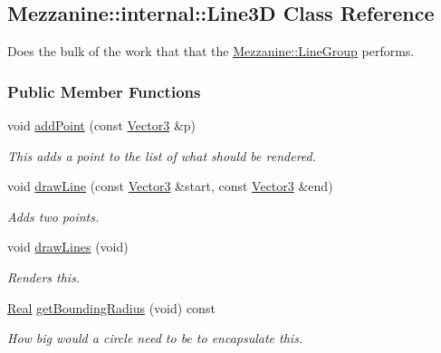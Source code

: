 \hypertarget{classMezzanine_1_1internal_1_1Line3D}{
\subsection{Mezzanine::internal::Line3D Class Reference}
\label{classMezzanine_1_1internal_1_1Line3D}
}


Does the bulk of the work that that the \hyperlink{classMezzanine_1_1LineGroup}{Mezzanine::LineGroup} performs.  


\subsubsection*{Public Member Functions}
\begin{DoxyCompactItemize}
\item 
void \hyperlink{classMezzanine_1_1internal_1_1Line3D_a6424bf33cfa273625e1c150905fb1afd}{addPoint} (const \hyperlink{classMezzanine_1_1Vector3}{Vector3} \&p)
\begin{DoxyCompactList}\small\item\em This adds a point to the list of what should be rendered. \item\end{DoxyCompactList}\item 
void \hyperlink{classMezzanine_1_1internal_1_1Line3D_a17264ad5672bef8807ce6b4a8366e573}{drawLine} (const \hyperlink{classMezzanine_1_1Vector3}{Vector3} \&start, const \hyperlink{classMezzanine_1_1Vector3}{Vector3} \&end)
\begin{DoxyCompactList}\small\item\em Adds two points. \item\end{DoxyCompactList}\item 
void \hyperlink{classMezzanine_1_1internal_1_1Line3D_a08ef83b2655025a9475340db5f092c39}{drawLines} (void)
\begin{DoxyCompactList}\small\item\em Renders this. \item\end{DoxyCompactList}\item 
\hyperlink{namespaceMezzanine_a726731b1a7df72bf3583e4a97282c6f6}{Real} \hyperlink{classMezzanine_1_1internal_1_1Line3D_a36e2a02fdd3c4cba33c6c5dc6c4a2c37}{getBoundingRadius} (void) const 
\begin{DoxyCompactList}\small\item\em How big would a circle need to be to encapsulate this. \item\end{DoxyCompactList}\item 

\end{DoxyCompactItemize}
